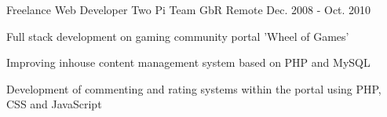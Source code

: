 \begin{cventries}
  \cventry
    {Freelance Web Developer} %
    {Two Pi Team GbR} %
    {Remote} %
    {Dec. 2008 - Oct. 2010} %
    {
      \begin{cvitems} %
        \item {Full stack development on gaming community portal 'Wheel of Games'}
        \item {Improving inhouse content management system based on PHP and MySQL}
        \item {Development of commenting and rating systems within the portal using PHP, CSS and JavaScript}
      \end{cvitems}
    }

\end{cventries}
